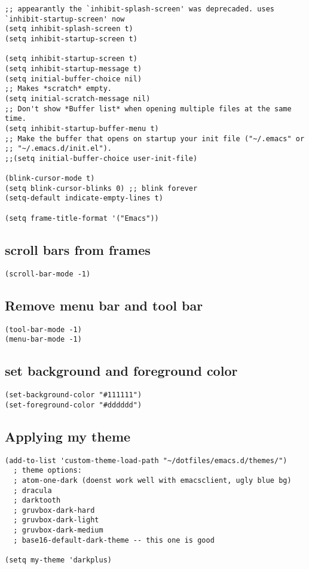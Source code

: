 \documentclass[11pt]{article}
\begin{document}
\begin{verbatim}
;; appearantly the `inhibit-splash-screen' was deprecaded. uses `inhibit-startup-screen' now
(setq inhibit-splash-screen t)
(setq inhibit-startup-screen t)

(setq inhibit-startup-screen t)
(setq inhibit-startup-message t)
(setq initial-buffer-choice nil)
;; Makes *scratch* empty.
(setq initial-scratch-message nil)
;; Don't show *Buffer list* when opening multiple files at the same time.
(setq inhibit-startup-buffer-menu t)
;; Make the buffer that opens on startup your init file ("~/.emacs" or
;; "~/.emacs.d/init.el").
;;(setq initial-buffer-choice user-init-file)

(blink-cursor-mode t)
(setq blink-cursor-blinks 0) ;; blink forever
(setq-default indicate-empty-lines t)

(setq frame-title-format '("Emacs"))
\end{verbatim}

\subsection*{scroll bars from frames}
\label{sec:orgb562bde}
\begin{verbatim}
(scroll-bar-mode -1)
\end{verbatim}

\subsection*{Remove menu bar and tool bar}
\label{sec:org9799607}
\begin{verbatim}
(tool-bar-mode -1)
(menu-bar-mode -1)
\end{verbatim}

\subsection*{set background and foreground color}
\label{sec:org011c495}

\begin{verbatim}
(set-background-color "#111111")
(set-foreground-color "#dddddd")
\end{verbatim}

\subsection*{Applying my theme}
\label{sec:org048232f}

\begin{verbatim}
(add-to-list 'custom-theme-load-path "~/dotfiles/emacs.d/themes/")
  ; theme options:
  ; atom-one-dark (doenst work well with emacsclient, ugly blue bg)
  ; dracula
  ; darktooth
  ; gruvbox-dark-hard
  ; gruvbox-dark-light
  ; gruvbox-dark-medium
  ; base16-default-dark-theme -- this one is good

(setq my-theme 'darkplus)
\end{verbatim}
\end{document}
